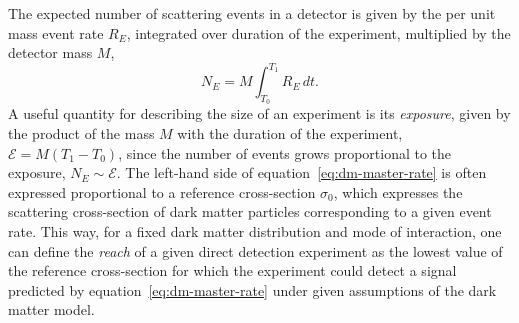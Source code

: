 \documentclass[b5paper, 10pt, twoside]{book}
\renewcommand{\vec}[1]{\symbfit{#1}}
\newcommand{\difd}{\,d}
\begin{document}
The expected number of scattering events in a detector is given by the per unit mass event rate $R_E$, integrated over duration of the experiment, multiplied by the detector mass $M$,
\begin{equation}
    N_E=M\int_{T_0}^{T_1} R_E\difd t.
\end{equation}
A useful quantity for describing the size of an experiment is its \emph{exposure}, given by the product of the mass $M$ with the duration of the experiment, $\mathcal{E}=M(T_1-T_0)$, since the number of events grows proportional to the exposure, $N_E\sim\mathcal{E}$. The left-hand side of equation~\eqref{eq:dm-master-rate} is often expressed proportional to a reference cross-section $\sigma_0$, which expresses the scattering cross-section of dark matter particles corresponding to a given event rate. This way, for a fixed dark matter distribution and mode of interaction, one can define the \emph{reach} of a given direct detection experiment as the lowest value of the reference cross-section for which the experiment could detect a signal predicted by equation~\eqref{eq:dm-master-rate} under given assumptions of the dark matter model.


\end{document}
